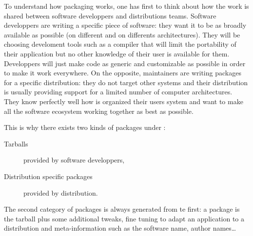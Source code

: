 


To understand how packaging works, one has first to think about how
the work is shared between software developpers and \linux
distributions teams.  Software developpers are writing a specific
piece of software: they want it to be as broadly available as possible
(on different \os and on differents architectures). They will be
choosing develoment tools such as a compiler that will limit the
portability of their application but no other knowledge of their user
\os is available for them. Developpers will just make code as generic
and customizable as possible in order to make it work everywhere.  On
the opposite, maintainers are writing packages for a specific \linux
distribution: they do not target other systems and their distribution
is usually providing support for a limited number of computer
architectures. They know perfectly well how is organized their users
system and want to make all the software ecosystem working together as
best as possible.


This is why there exists two kinds of packages under \linux:
\begin{description}
\item[Tarballs] provided by software developpers,
\item[Distribution specific packages] provided by \linux distribution.
\end{description}


The second category of packages is always generated from te first: a
package is the tarball plus some additional tweaks, fine tuning to
adapt an application to a distribution and meta-information such as
the software name, author names\ldots

